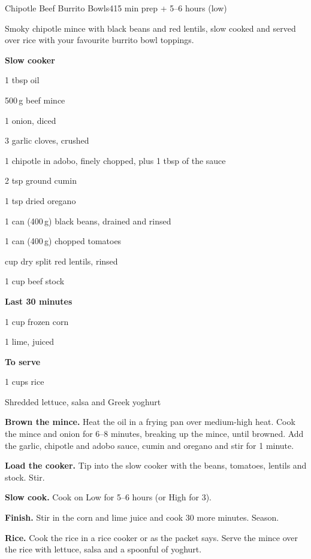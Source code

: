 \begin{recipebox}{Chipotle Beef Burrito Bowls}{4}{15 min prep + 5--6 hours (low)}

Smoky chipotle mince with black beans and red lentils, slow cooked and served
over rice with your favourite burrito bowl toppings.

\begin{ingredients}
  \item[] \textbf{Slow cooker}
  \item 1 tbsp oil
  \item 500\,g beef mince
  \item 1 onion, diced
  \item 3 garlic cloves, crushed
  \item 1 chipotle in adobo, finely chopped, plus 1 tbsp of the sauce
  \item 2 tsp ground cumin
  \item 1 tsp dried oregano
  \item 1 can (400\,g) black beans, drained and rinsed
  \item 1 can (400\,g) chopped tomatoes
  \item {} cup dry split red lentils, rinsed
  \item 1 cup beef stock
  \item[] \textbf{Last 30 minutes}
  \item 1 cup frozen corn
  \item 1 lime, juiced
  \item[] \textbf{To serve}
  \item 1 cups rice
  \item Shredded lettuce, salsa and Greek yoghurt
\end{ingredients}

\begin{method}
  \item \textbf{Brown the mince.} Heat the oil in a frying pan over medium-high heat.
        Cook the mince and onion for 6--8 minutes, breaking up the mince, until
        browned. Add the garlic, chipotle and adobo sauce, cumin and oregano and
        stir for 1 minute.
  \item \textbf{Load the cooker.} Tip into the slow cooker with the beans, tomatoes,
        lentils and stock. Stir.
  \item \textbf{Slow cook.} Cook on Low for 5--6 hours (or High for 3).
  \item \textbf{Finish.} Stir in the corn and lime juice and cook 30 more minutes.
        Season.
  \item \textbf{Rice.} Cook the rice in a rice cooker or as the packet says. Serve
        the mince over the rice with lettuce, salsa and a spoonful of yoghurt.
\end{method}


\end{recipebox}
